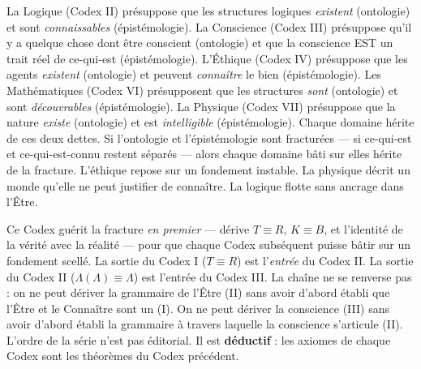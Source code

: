 \documentclass[10pt, openany, oneside]{book}
\begin{document}
\vspace{0.3em}

\noindent La Logique (Codex II) présuppose que les structures logiques \textit{existent} (ontologie) et sont \textit{connaissables} (épistémologie). La Conscience (Codex III) présuppose qu'il y a quelque chose dont être conscient (ontologie) et que la conscience EST un trait réel de ce-qui-est (épistémologie). L'Éthique (Codex IV) présuppose que les agents \textit{existent} (ontologie) et peuvent \textit{connaître} le bien (épistémologie). Les Mathématiques (Codex VI) présupposent que les structures \textit{sont} (ontologie) et sont \textit{découvrables} (épistémologie). La Physique (Codex VII) présuppose que la nature \textit{existe} (ontologie) et est \textit{intelligible} (épistémologie). Chaque domaine hérite de ces deux dettes. Si l'ontologie et l'épistémologie sont fracturées --- si ce-qui-est et ce-qui-est-connu restent séparés --- alors chaque domaine bâti sur elles hérite de la fracture. L'éthique repose sur un fondement instable. La physique décrit un monde qu'elle ne peut justifier de connaître. La logique flotte sans ancrage dans l'Être.

\vspace{0.3em}

\noindent Ce Codex guérit la fracture \textit{en premier} --- dérive $T \equiv R$, $K \equiv B$, et l'identité de la vérité avec la réalité --- pour que chaque Codex subséquent puisse bâtir sur un fondement scellé. La sortie du Codex I ($T \equiv R$) est l'\textit{entrée} du Codex II. La sortie du Codex II ($\Lambda(\Lambda) \equiv \Lambda$) est l'entrée du Codex III. La chaîne ne se renverse pas : on ne peut dériver la grammaire de l'Être (II) sans avoir d'abord établi que l'Être et le Connaître sont un (I). On ne peut dériver la conscience (III) sans avoir d'abord établi la grammaire à travers laquelle la conscience s'articule (II). L'ordre de la série n'est pas éditorial. Il est \textbf{déductif} : les axiomes de chaque Codex sont les théorèmes du Codex précédent.
\end{document}
